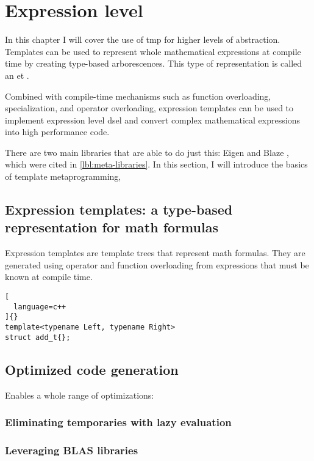 \documentclass[../main]{subfiles}
\begin{document}
\section{
  Expression level
}
\label{lbl:expression-level-metaprogramming}

In this chapter I will cover the use of \gls{tmp} for higher levels
of abstraction. Templates can be used to represent whole mathematical
expressions at compile time by creating type-based arborescences.
This type of representation is called an \gls{et} \cite{veldhuizen:1995}.

Combined with compile-time mechanisms such as function overloading,
specialization, and operator overloading, expression templates can be used to
implement expression level \gls{dsel}\acrpluralsuffix{} and convert complex
mathematical expressions into high performance code.

There are two main libraries that are able to do just this: Eigen \cite{eigen}
and Blaze \cite{blazelib}, which were cited in \ref{lbl:meta-libraries}.
In this section, I will introduce the basics of \cpp template metaprogramming,

\subsection{
  Expression templates: a type-based representation for math formulas
}

Expression templates are template trees that represent math formulas.
They are generated using operator and function overloading from expressions
that must be known at compile time.

\begin{lstlisting}[
  language=c++
]{}
template<typename Left, typename Right>
struct add_t{};
\end{lstlisting}


\subsection{
  Optimized code generation
}

Enables a whole range of optimizations:

\subsubsection{
  Eliminating temporaries with lazy evaluation
}

\subsubsection{
  Leveraging BLAS libraries
}
\end{document}
